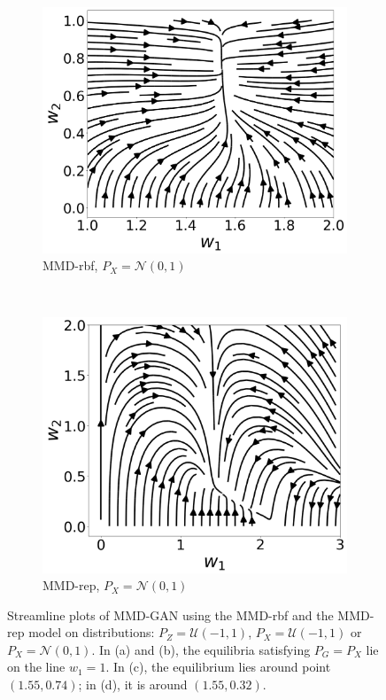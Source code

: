 \documentclass{article} %
\theoremstyle{plain}
\newtheorem*{proposition 1*}{Proposition 1}
\newcommand{\ds}[1]{\mathcal{#1}}  %
\begin{document}
\begin{appendices}
\begin{figure}[tb]
	\begin{subfigure}[t]{0.4\linewidth}
		\centering
		\includegraphics[width=1\textwidth]{mmd_stream_uvn.png}
		\caption{MMD-rbf, \(P_X=\ds{N}(0,1)\)\label{fig:u_vs_n}}
	\end{subfigure}
	~
	\begin{subfigure}[t]{0.4\linewidth}
		\centering
		\includegraphics[width=1\textwidth]{rep_stream_uvn.png}
		\caption{MMD-rep, \(P_X=\ds{N}(0,1)\)\label{fig:u_vs_n_rep}}
	\end{subfigure}
	\caption{Streamline plots of MMD-GAN using the MMD-rbf and the MMD-rep model on distributions: \(P_Z=\ds{U}(-1,1)\), \(P_X=\ds{U}(-1,1)\) or \(P_X=\ds{N}(0,1)\). In (a) and (b), the equilibria satisfying \(P_G=P_X\) lie on the line \(w_1=1\). In (c), the equilibrium lies around point \((1.55, 0.74)\); in (d), it is around \((1.55, 0.32)\).}  
	\label{fig:streamplot}
\end{figure}


\end{appendices}
\end{document}

